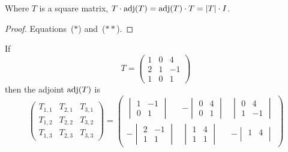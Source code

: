 \begin{theorem}
\label{th:MatTimesAdjEqDiagDets}
Where \( T \) is a square matrix,
$T\cdot \adj(T)=\adj(T)\cdot T=\deter{T}\cdot I$.
\end{theorem}

\begin{proof}
Equations~($*$) and~($**$).
\end{proof}

\begin{example}    \label{ex:MatTimesAdjEqDets}
If
\begin{equation*}
  T=\begin{pmatrix}
        1  &0  &4  \\
        2  &1  &-1 \\
        1  &0  &1
      \end{pmatrix}
\end{equation*}
then the adjoint $\operatorname{adj}(T)$ is
\begin{equation*}
    \begin{pmatrix}
      T_{1,1}  &T_{2,1}  &T_{3,1} \\
      T_{1,2}  &T_{2,2}  &T_{3,2} \\
      T_{1,3}  &T_{2,3}  &T_{3,3}   
    \end{pmatrix}
    \!\!=\!\!\begin{pmatrix}
      \begin{vmatrix}
           1  &-1 \\
           0  &1
         \end{vmatrix}
      &-\begin{vmatrix}
             0  &4  \\
             0  &1
           \end{vmatrix}
      &\begin{vmatrix}
             0  &4  \\
             1  &-1
         \end{vmatrix}             \\[2.1ex]
      -\begin{vmatrix}
           2  &-1 \\
           1  &1
         \end{vmatrix}
      &\begin{vmatrix}
             1  &4  \\
             1  &1
           \end{vmatrix}
      &-\begin{vmatrix}
             1  &4  \\

\end{vmatrix}
\end{pmatrix}
\end{equation*}
\end{example}

